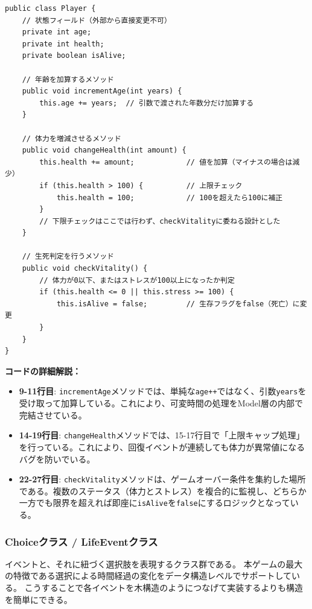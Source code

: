 \documentclass[a4paper,11pt]{jsarticle}
\begin{document}
\begin{lstlisting}[caption=Player.java, label=code:player_detail]
public class Player {
    // 状態フィールド（外部から直接変更不可）
    private int age;
    private int health;
    private boolean isAlive;

    // 年齢を加算するメソッド
    public void incrementAge(int years) {
        this.age += years;  // 引数で渡された年数分だけ加算する
    }

    // 体力を増減させるメソッド
    public void changeHealth(int amount) {
        this.health += amount;            // 値を加算（マイナスの場合は減少）
        if (this.health > 100) {          // 上限チェック
            this.health = 100;            // 100を超えたら100に補正
        }
        // 下限チェックはここでは行わず、checkVitalityに委ねる設計とした
    }

    // 生死判定を行うメソッド
    public void checkVitality() {
        // 体力が0以下、またはストレスが100以上になったか判定
        if (this.health <= 0 || this.stress >= 100) {
            this.isAlive = false;         // 生存フラグをfalse（死亡）に変更
        }
    }
}
\end{lstlisting}

\textbf{コードの詳細解説：}
\begin{itemize}
    \item \textbf{9-11行目}: \texttt{incrementAge}メソッドでは、単純な\texttt{age++}ではなく、引数\texttt{years}を受け取って加算している。これにより、可変時間の処理をModel層の内部で完結させている。
    \item \textbf{14-19行目}: \texttt{changeHealth}メソッドでは、15-17行目で「上限キャップ処理」を行っている。これにより、回復イベントが連続しても体力が異常値になるバグを防いでいる。
    \item \textbf{22-27行目}: \texttt{checkVitality}メソッドは、ゲームオーバー条件を集約した場所である。複数のステータス（体力とストレス）を複合的に監視し、どちらか一方でも限界を超えれば即座に\texttt{isAlive}を\texttt{false}にするロジックとなっている。
\end{itemize}

\subsubsection{Choiceクラス / LifeEventクラス}
イベントと、それに紐づく選択肢を表現するクラス群である。
本ゲームの最大の特徴である選択による時間経過の変化をデータ構造レベルでサポートしている。
こうすることで各イベントを木構造のようにつなげて実装するよりも構造を簡単にできる。
\end{document}
